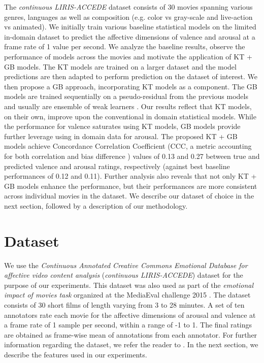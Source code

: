 \documentclass{article}
\begin{document}
\begin{spacing}{0.9}
The {\it continuous LIRIS-ACCEDE} dataset consists of 30 movies spanning various genres, languages as well as composition (e.g. color vs gray-scale and live-action vs animated).
We initially train various baseline statistical models on the limited in-domain dataset to predict the affective dimensions of valence and arousal at a frame rate of 1 value per second.
We analyze the baseline results, observe the performance of models across the movies and motivate the application of KT + GB models.
The KT models are trained on a larger dataset and the model predictions are then adapted to perform prediction on the dataset of interest.
We then propose a GB approach, incorporating KT models as a component.
The GB models are trained sequentially on a pseudo-residual from the previous models and usually are ensemble of weak learners \cite{friedman2001greedy}. 
Our results reflect that KT models, on their own, improve upon the conventional in domain statistical models.
While the performance for valence saturates using KT models, GB models provide further leverage using in domain data for arousal.
The proposed KT + GB models achieve Concordance Correlation Coefficient (CCC, a metric accounting for both correlation and bias difference \cite{liao2000note,valstar2016avec}) values of 0.13 and 0.27 between true and predicted valence and arousal ratings, respectively (against best baseline performances of 0.12 and 0.11).
Further analysis also reveals that not only KT + GB models enhance the performance, but their performances are more consistent across individual movies in the dataset.
We describe our dataset of choice in the next section, followed by a description of our methodology.


\vspace{-2mm}
\section{Dataset}
\vspace{-2mm}

We use the {\it Continuous Annotated Creative Commons Emotional Database for affective video content analysis} ({\it continuous LIRIS-ACCEDE}) dataset for the purpose of our experiments.
This dataset was also used as part of the {\it emotional impact of movies task} organized at the MediaEval challenge 2015 \cite{sjoberg2015mediaeval}.
The dataset consists of 30 short films of length varying from 3 to 28 minutes.
A set of ten annotators rate each movie for the affective dimensions of arousal and valence at a frame rate of 1 sample per second, within a range of -1 to 1.
The final ratings are obtained as frame-wise mean of annotations from each annotator. 
For further information regarding the dataset, we refer the reader to \cite{baveye2015liris}.
In the next section, we describe the features used in our experiments.


\end{spacing}
\end{document}
